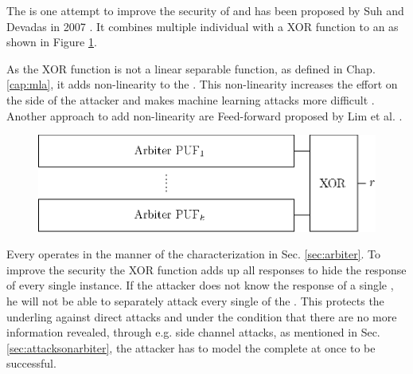 The \xpuf is one attempt to improve the security of \apufs and has been proposed by Suh and Devadas in 2007 \cite{Suh2007PhysicalGeneration}.
It combines multiple individual \apufs with a \acf{XOR} function to an \xpuf as shown in Figure \ref{fig:xorarbiter}.

As the \ac{XOR} function is not a linear separable function, as defined in Chap. \ref{cap:mla}, it adds non-linearity to the \puf. 
This non-linearity increases the effort on the side of the attacker and makes machine learning attacks more difficult \cite{Becker2010OnBifurcation, Lim2005ExtractingCircuits}.
Another approach to add non-linearity are Feed-forward \apufs proposed by Lim et al. \cite{Lim2005ExtractingCircuits}.

\begin{figure}[ht]
\centering
\includegraphics[width=1.00\textwidth]{images/xor_arbiter.eps}
\caption[\acs{XOR} \apuf]{\xpuf}
\label{fig:xorarbiter}
\end{figure}

Every \apuf operates in the manner of the characterization in Sec. \ref{sec:arbiter}. 
To improve the security the \ac{XOR} function adds up all responses to hide the response of every single \apuf instance.
If the attacker does not know the response of a single \apuf, he will not be able to separately attack every single \apuf of the \xpuf \cite{Becker2015ThePUFs}. %
This protects the underling \apufs against direct attacks and under the condition that there are no more information revealed, through e.g. side channel attacks, as mentioned in Sec. \ref{sec:attacksonarbiter}, the attacker has to model the complete \xpuf at once to be successful.


